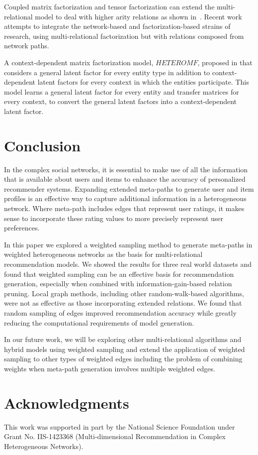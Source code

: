 \documentclass {acmart}
\begin{document}
Coupled matrix factorization and tensor factorization can extend the multi-relational model to deal with higher arity relations as shown in~\cite{DBLP:journals/corr/abs-1105-3422}. Recent work attempts to integrate the network-based and factorization-based strains of research, using multi-relational factorization but with relations composed from network paths.

A context-dependent matrix factorization model, $HETEROMF$, proposed in  \cite{jamali2013heteromf} that considers a general latent factor for every entity type in addition to context-dependent latent factors for every context in which the entities participate. This model learns a general latent factor for every entity and transfer  matrices for every context, to convert the general latent factors into a context-dependent latent factor.
 
\section{Conclusion}	
\noindent
In the complex social networks, it is essential to make use of all the information that is available about users and items to enhance the accuracy of personalized recommender systems. Expanding extended meta-paths to generate user and item profiles is an effective way to capture additional information in a heterogeneous network. Where meta-path includes edges that represent user ratings, it makes sense to incorporate these rating values to more precisely represent user preferences. 

In this paper we explored a weighted sampling method to generate meta-paths in weighted heterogeneous networks as the basis for multi-relational recommendation models. We showed the results for three real world datasets and found that weighted sampling can be an effective basis for recommendation generation, especially when combined with information-gain-based relation pruning. Local graph methods, including other random-walk-based algorithms, were not as effective as those incorporating extended relations. We found that random sampling of edges improved recommendation accuracy while greatly reducing the computational requirements of model generation. 

In our future work, we will be exploring other multi-relational algorithms and hybrid models using weighted sampling and extend the application of weighted sampling to other types of weighted edges including the problem of combining weights when meta-path generation involves multiple weighted edges.

\section*{Acknowledgments}
This work was supported in part by the National Science Foundation under Grant No. IIS-1423368 (Multi-dimensional Recommendation in Complex Heterogeneous Networks).




 
\end{document}
